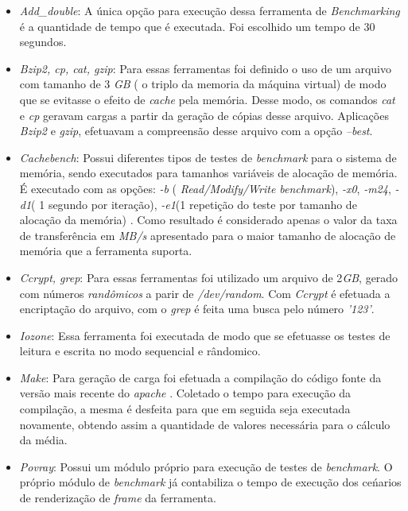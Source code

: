 \begin{itemize}
\item \textit{Add\_double}: A única opção para execução dessa ferramenta de \textit{Benchmarking} é a quantidade de tempo que é executada. Foi escolhido um tempo de 30 segundos.

\item \textit{Bzip2, cp, cat, gzip}: Para essas ferramentas foi definido o uso de um arquivo com tamanho de 3 \textit{GB} ( o triplo da memoria da máquina virtual) de modo que se evitasse o efeito de \textit{cache} pela memória. Desse modo, os comandos \textit{cat} e \textit{cp} geravam cargas a partir da geração de cópias desse arquivo. Aplicações \textit{Bzip2} e \textit{gzip}, efetuavam a compreensão desse arquivo com a opção \textit{--best}.

\item \textit{Cachebench}: Possui diferentes tipos de testes de \textit{benchmark} para o sistema de memória, sendo executados para tamanhos variáveis de alocação de memória. É executado com as opções: \textit{-b} ( \textit{Read/Modify/Write benchmark}), \textit{-x0}, \textit{-m24}, \textit{-d1}( 1 segundo por iteração), \textit{-e1}(1 repetição do teste por tamanho de alocação da memória) . Como resultado é considerado apenas o valor da taxa de transferência em \textit{MB/s} apresentado para o maior tamanho de alocação de memória que a ferramenta suporta.

\item  \textit{Ccrypt, grep}: Para essas ferramentas foi utilizado um arquivo de 2\textit{GB}, gerado com números \textit{randômicos} a parir de \textit{/dev/random}. Com \textit{Ccrypt} é efetuada a encriptação do arquivo, com o \textit{grep} é feita uma busca pelo número \textit{'123'}.

\item \textit{Iozone}: Essa ferramenta foi executada de modo que se efetuasse os testes de leitura e escrita no modo sequencial e rândomico.

\item \textit{Make}: Para geração de carga foi efetuada a compilação do código fonte da versão mais recente do \textit{apache} \footnotemark[8]                                                                                                                              . Coletado o tempo para execução da compilação, a mesma é desfeita para que em seguida seja executada novamente, obtendo assim a quantidade de valores necessária para o cálculo da média.

\item \textit{Povray}: Possui um módulo próprio para execução de testes de \textit{benchmark}. O próprio módulo de \textit{benchmark} já contabiliza o tempo de execução dos ceńarios de renderização de \textit{frame} da ferramenta. 

\end{itemize}

